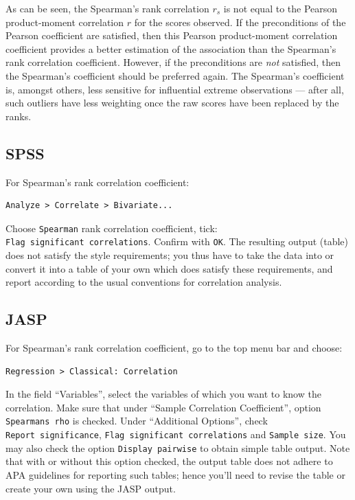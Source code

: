 \documentclass[
]{book}
\begin{document}
As can be seen, the Spearman's rank correlation \(r_s\) is not equal to the
Pearson product-moment correlation \(r\) for the scores observed.
If the preconditions of the Pearson coefficient are satisfied, then this
Pearson product-moment correlation coefficient provides a better estimation of the
association than the Spearman's rank correlation coefficient. However, if the preconditions
are \emph{not} satisfied, then the Spearman's coefficient should be preferred again. The
Spearman's coefficient is, amongst others, less sensitive for influential extreme
observations --- after all, such outliers have less weighting once the
raw scores have been replaced by the ranks.

\subsection{SPSS}\label{spss-7}

For Spearman's rank correlation coefficient:

\begin{verbatim}
Analyze > Correlate > Bivariate...
\end{verbatim}

Choose \texttt{Spearman} rank correlation coefficient, tick:
\texttt{Flag\ significant\ correlations}. Confirm with \texttt{OK}. The resulting
output (table) does not satisfy the style requirements; you thus have to take
the data into or convert it into a table of your own which does satisfy these requirements,
and report according to the usual conventions for correlation analysis.

\subsection{JASP}\label{jasp-8}

For Spearman's rank correlation coefficient, go to the top menu bar and choose:

\begin{verbatim}
Regression > Classical: Correlation
\end{verbatim}

In the field ``Variables'', select the variables of which you want to know the correlation.
Make sure that under ``Sample Correlation Coefficient'', option \texttt{Spearman\textquotesingle{}s\ rho} is checked.
Under ``Additional Options'', check \texttt{Report\ significance}, \texttt{Flag\ significant\ correlations} and \texttt{Sample\ size}. You may also check the option \texttt{Display\ pairwise} to obtain simple table output.
Note that with or without this option checked, the output table does not adhere to APA guidelines for reporting such tables; hence you'll need to revise the table or create your own using the JASP output.
\end{document}
